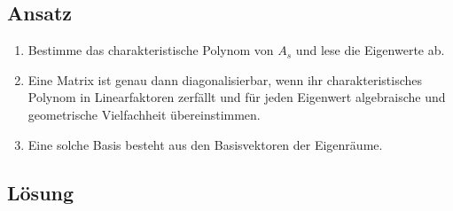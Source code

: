 \subsection{Ansatz}
\begin{enumerate}
	\item Bestimme das charakteristische Polynom von \( A_s \) und lese die Eigenwerte ab.
	\item Eine Matrix ist genau dann diagonalisierbar, wenn ihr charakteristisches Polynom in Linearfaktoren zerfällt und für jeden Eigenwert algebraische und geometrische Vielfachheit übereinstimmen.
	\item Eine solche Basis besteht aus den Basisvektoren der Eigenräume. 
\end{enumerate}

\subsection{Lösung}

